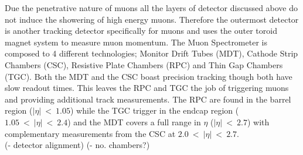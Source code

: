 		Due the penetrative nature of muons all the layers of detector discussed above do not induce the showering of high energy muons. Therefore the outermost detector is another tracking detector specifically for muons and uses the outer toroid magnet system to measure muon momentum. The Muon Spectrometer is composed to 4 different technologies; Monitor Drift Tubes (MDT), Cathode Strip Chambers (CSC), Resistive Plate Chambers (RPC) and Thin Gap Chambers (TGC). Both the MDT and the CSC boast precision tracking though both have slow readout times. This leaves the RPC and TGC the job of triggering muons and providing additional track measurements. The RPC are found in the barrel region ($|\eta|~<~1.05$) while the TGC trigger in the endcap region ($1.05~<~|\eta|~<~2.4$) and the MDT covers a full range in $\eta$ ($|\eta|~<~2.7$) with complementary measurements from the CSC at $2.0~<~|\eta|~<~2.7$.\\
		(- detector alignment)
		(- no. chambers?)





